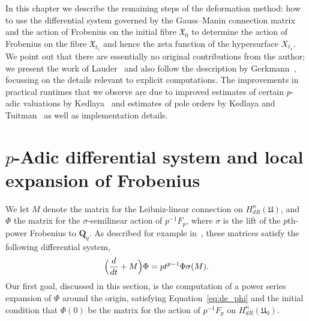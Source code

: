 
In this chapter we describe the remaining steps of the deformation method:  
how to use the differential system governed by the Gauss--Manin connection 
matrix and the action of Frobenius on the initial fibre $\mathfrak{X}_0$ 
to determine the action of Frobenius on the fibre $\mathfrak{X}_{t_1}$ 
and hence the zeta function of the hypersurface $X_{t_1}$.
We point out that there are essentially no original contributions from the 
author;  we present the work of Lauder~\citep{Lau04} and also follow the 
description by Gerkmann~\citep{Gerkmann2007}, focussing on the details 
relevant to explicit computations.  The improvements in practical runtimes 
that we observe are due to improved estimates of certain $p$-adic valuations 
by Kedlaya~\citep{Kedlaya2010} and estimates of pole orders by Kedlaya and 
Tuitman~\citep{KedlayaTuitman2012} as well as implementation details.

\section{$p$-Adic differential system and local expansion of Frobenius}

We let $M$ denote the matrix for the Leibniz-linear connection on 
$H_{dR}^n(\mathfrak{U})$, and $\Phi$ the matrix for the $\sigma$-semilinear 
action of $p^{-1} F_p$, where $\sigma$ is the lift of the $p$th-power 
Frobenius to $\mathbf{Q}_q$.  As described for example 
in~\citep[\S 5]{Gerkmann2007}, these matrices satisfy the following 
differential system,
\begin{equation} \label{eq:de_phi}
\Bigl(\frac{d}{dt} + M\Bigr) \Phi = p t^{p-1} \Phi \sigma(M).
\end{equation}
Our first goal, discussed in this section, is the computation of 
a power series expansion of $\Phi$ around the origin, satisfying 
Equation~\eqref{eq:de_phi} and the initial condition that $\Phi(0)$ 
be the matrix for the action of $p^{-1} F_p$ on $H_{dR}^n(\mathfrak{U}_0)$.

